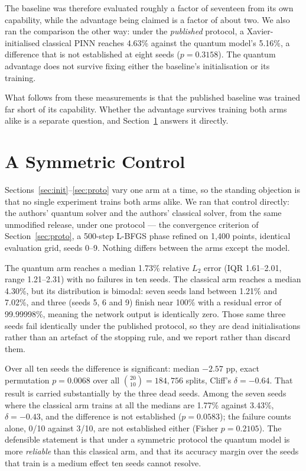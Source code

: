 \documentclass[conference,a4paper]{IEEEtran}
\begin{document}
The baseline was therefore evaluated roughly a factor of seventeen from its own
capability, while the advantage being claimed is a factor of about two. We also ran the
comparison the other way: under the \emph{published} protocol, a Xavier-initialised
classical PINN reaches 4.63\% against the quantum model's 5.16\%, a difference that is not
established at eight seeds ($p = 0.3158$). The quantum advantage does not survive fixing
either the baseline's initialisation or its training.

What follows from these measurements is that the published baseline was trained far short
of its capability. Whether the advantage survives training both arms alike is a separate
question, and Section~\ref{sec:sym} answers it directly.

\section{A Symmetric Control}
\label{sec:sym}

Sections~\ref{sec:init}--\ref{sec:proto} vary one arm at a time, so the standing objection
is that no single experiment trains both arms alike. We ran that control directly: the
authors' quantum solver and the authors' classical solver, from the same unmodified
release, under one protocol --- the convergence criterion of Section~\ref{sec:proto}, a
500-step L-BFGS phase refined on 1{,}400 points, identical evaluation grid, seeds 0--9.
Nothing differs between the arms except the model.

The quantum arm reaches a median 1.73\% relative $L_2$ error (IQR 1.61--2.01, range
1.21--2.31) with no failures in ten seeds. The classical arm reaches a median 4.30\%, but
its distribution is bimodal: seven seeds land between 1.21\% and 7.02\%, and three (seeds
5, 6 and 9) finish near 100\% with a residual error of 99.99998\%, meaning the network
output is identically zero. Those same three seeds fail identically under the published
protocol, so they are dead initialisations rather than an artefact of the stopping rule,
and we report rather than discard them.

Over all ten seeds the difference is significant: median $-2.57$ pp, exact permutation
$p = 0.0068$ over all $\binom{20}{10} = 184{,}756$ splits, Cliff's $\delta = -0.64$. That
result is carried substantially by the three dead seeds. Among the seven seeds where the
classical arm trains at all the medians are 1.77\% against 3.43\%, $\delta = -0.43$, and
the difference is not established ($p = 0.0583$); the failure counts alone, 0/10 against
3/10, are not established either (Fisher $p = 0.2105$). The defensible statement is that
under a symmetric protocol the quantum model is more \emph{reliable} than this classical
arm, and that its accuracy margin over the seeds that train is a medium effect ten seeds
cannot resolve.
\end{document}
